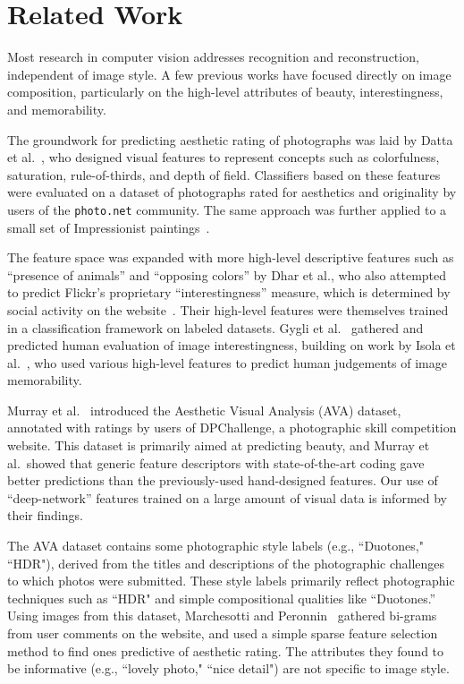 
\section{Related Work}

Most research in computer vision addresses recognition and reconstruction, independent of image style.  A few previous works have focused directly on image composition, particularly on the high-level attributes of beauty, interestingness, and memorability.

The groundwork for predicting aesthetic rating of photographs was laid by Datta et al.~\cite{Datta-ECCV-2006}, who designed visual features to represent concepts such as colorfulness, saturation, rule-of-thirds, and depth of field.
Classifiers based on these features were evaluated on a dataset of photographs rated for aesthetics and originality by users of the \texttt{photo.net} community.
The same approach was further applied to a small set of Impressionist paintings~\cite{Li-SP-2009}.

The feature space was expanded with more high-level descriptive features such as ``presence of animals'' and ``opposing colors'' by Dhar et al., who also attempted to predict Flickr's proprietary ``interestingness'' measure, which is determined by social activity on the website~\cite{Dhar-CVPR-2011}.
Their high-level features were themselves trained in a classification framework on labeled datasets.
Gygli et al.~\cite{Gygli-ICCV-2013} gathered and predicted human evaluation of image interestingness, building on work by Isola et al.~\cite{Isola-CVPR-2011}, who used various high-level features to predict human judgements of image memorability.

Murray et al.~\cite{Murray-CVPR-2012} introduced the Aesthetic Visual Analysis (AVA) dataset, annotated with ratings by users of DPChallenge, a photographic skill competition website.
This dataset is primarily aimed at predicting beauty, and Murray et al.~showed that generic feature descriptors with state-of-the-art coding gave better predictions than the previously-used hand-designed features.
Our use of ``deep-network'' features trained on a large amount of visual data is informed by their findings.

The AVA dataset contains some photographic style labels (e.g., ``Duotones," ``HDR"), derived from the titles and descriptions of the photographic challenges to which photos were submitted. These style labels primarily reflect photographic techniques such as ``HDR" and simple compositional qualities like ``Duotones.''
Using images from this dataset, Marchesotti and Peronnin~\cite{Marchesotti-BMVC-2013} gathered bi-grams from user comments on the website, and used a simple sparse feature selection method to find ones predictive of aesthetic rating.
The attributes they found to be informative (e.g., ``lovely photo," ``nice detail") are not specific to image style.

